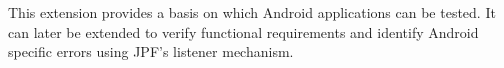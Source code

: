 \documentclass{acm_proc_article-sp}
\begin{document}
This extension provides a basis on which Android applications can be tested. It can later be extended to verify functional requirements and identify Android specific errors using JPF's listener mechanism.


% 
\scriptsize
\end{document}
